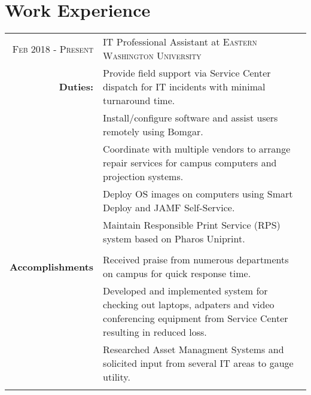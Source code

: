 \documentclass[a4paper,10pt]{article}
\begin{document}
\section{Work Experience}
\begin{tabular}{r|p{14cm}}
\textsc{Feb 2018 - Present} & IT Professional Assistant at \textsc{Eastern Washington University}\\
	\textbf{Duties:}& \footnotesize{\textbullet Provide field support via Service Center dispatch for IT incidents with minimal turnaround time.}\\
	& \footnotesize{\textbullet Install/configure software and assist users remotely using Bomgar. } \\
	& \footnotesize{\textbullet Coordinate with multiple vendors to arrange repair services for campus computers and projection systems.}\\
	& \footnotesize{\textbullet Deploy OS images on computers using Smart Deploy and JAMF Self-Service.}\\
	& \footnotesize{\textbullet Maintain Responsible Print Service (RPS) system based on Pharos Uniprint.}\\
	\\
	\textbf{Accomplishments} & \footnotesize{\textbullet Received praise from numerous departments on campus for quick response time.}\\
	& \footnotesize{\textbullet Developed and implemented system for checking out laptops, adpaters and video conferencing equipment from Service Center resulting in reduced loss.}\\
	& \footnotesize{\textbullet Researched Asset Managment Systems and solicited input from several IT areas to gauge utility.}\\
	\multicolumn{2}{c}{} \\


\end{tabular}
\end{document}
